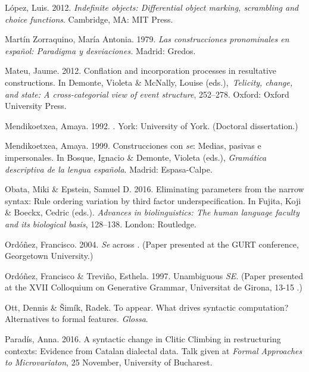 \documentclass[output=paper]{langsci/langscibook}
\begin{document}
\begin{styleTextbodyindent}
López, Luis. 2012. \textit{Indefinite objects: Differential object marking, scrambling and choice functions}. Cambridge, MA: MIT Press.
\end{styleTextbodyindent}

\begin{styleTextbodyindent}
Martín Zorraquino, María Antonia. 1979. \textit{Las construcciones pronominales en español: Paradigma y desviaciones.} Madrid: Gredos.
\end{styleTextbodyindent}

\begin{styleTextbodyindent}
Mateu, Jaume. 2012. Conflation and incorporation processes in resultative constructions. In Demonte, Violeta \& McNally, Louise (eds.),~\textit{Telicity, change, and state: A cross-categorial view of event structure}, 252–278. Oxford: Oxford University Press.
\end{styleTextbodyindent}

Mendikoetxea, Amaya. 1992.  . York: University of York. (Doctoral dissertation.)

Mendikoetxea, Amaya. 1999. Construcciones con \textit{se}: Medias, pasivas e impersonales. In Bosque, Ignacio \& Demonte, Violeta (eds.), \textit{Gramática descriptiva de la lengua española}. Madrid: Espasa-Calpe.

Obata, Miki \& Epstein, Samuel D. 2016. Eliminating parameters from the narrow syntax: Rule ordering variation by third factor underspecification. In Fujita, Koji \& Boeckx, Cedric (eds.). \textit{Advances in biolinguistics: The human language faculty and its biological basis}, 128–138. London: Routledge.

Ordóñez, Francisco. 2004. \textit{Se} across . (Paper presented at the GURT conference, Georgetown University.)

Ordóñez, Francisco \& Treviño, Esthela. 1997. Unambiguous \textit{SE}. (Paper presented at the XVII Colloquium on Generative Grammar, Universitat de Girona, 13-15 \citealt{June2007}.)

Ott, Dennis \& Šimík, Radek. To appear. What drives syntactic computation? Alternatives to formal features. \textit{Glossa}.

Paradís, Anna. 2016. A syntactic change in Clitic Climbing in restructuring contexts: Evidence from Catalan dialectal data. Talk given at \textit{Formal Approaches to  Microvariaton}, 25 November, University of Bucharest. 
\end{document}
